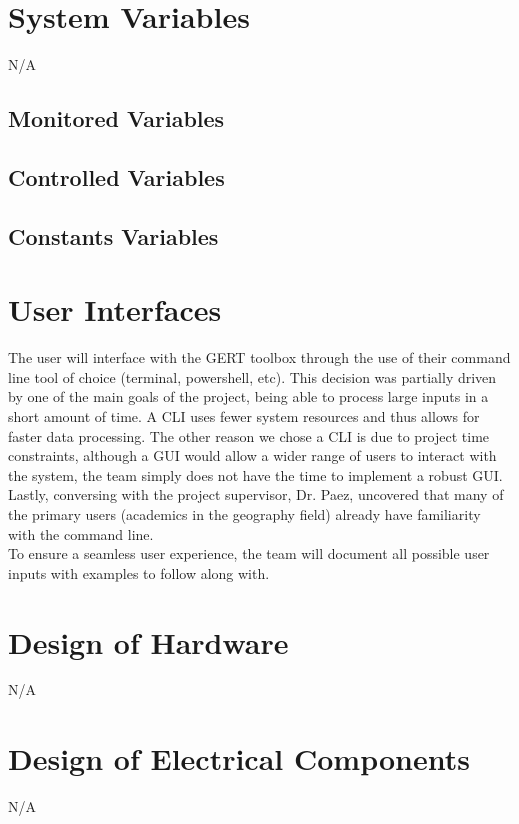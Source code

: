 \documentclass[12pt, titlepage]{article}
\begin{document}
\section{System Variables}
\noindent N/A

\subsection{Monitored Variables}

\subsection{Controlled Variables}

\subsection{Constants Variables}

\section{User Interfaces}

\noindent The user will interface with the GERT toolbox through the use of their command line tool of choice (terminal, powershell, etc). This decision was partially driven by one of the main goals of the project, being able to process large inputs in a short amount of time. A CLI uses fewer system resources and thus allows for faster data processing. The other reason we chose a CLI is due to project time constraints, although a GUI would allow a wider range of users to interact with the system, the team simply does not have the time to implement a robust GUI. Lastly, conversing with the project supervisor, Dr. Paez, uncovered that many of the primary users (academics in the geography field) already have familiarity with the command line.\\

\noindent To ensure a seamless user experience, the team will document all possible user inputs with examples to follow along with. 

\section{Design of Hardware}
\noindent N/A

\section{Design of Electrical Components}
\noindent N/A
\end{document}
